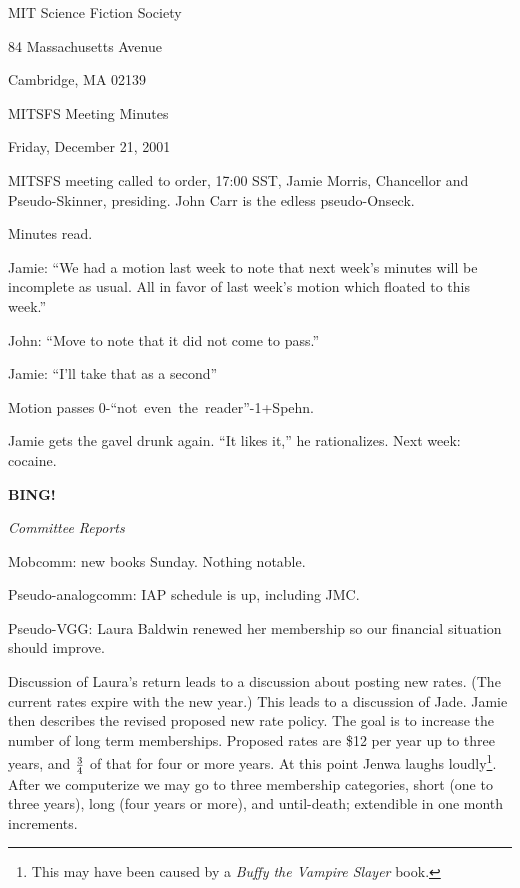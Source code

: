 \documentclass[12pt]{article}
\newcommand{\bing}{{\bf BING!} }
\newcommand{\goto}[1]{\bing \vskip 12pt \centerline{{\em{#1}}}}
\begin{document}
\begin{center}

MIT Science Fiction Society 

84 Massachusetts Avenue

Cambridge, MA 02139

\vspace{12pt}

MITSFS Meeting Minutes 

Friday, December 21, 2001

\end{center}
 
\vspace{18pt}

\setlength{\parskip}{6pt}

\noindent
MITSFS meeting called to order, 17:00 SST, Jamie Morris, Chancellor
and Pseudo-Skinner, presiding.  John Carr is the edless pseudo-Onseck.

Minutes read.

Jamie: ``We had a motion last week to note that next week's minutes will be
incomplete as usual.  All in favor of last week's motion which floated to
this week.''

John: ``Move to note that it did not come to pass.''

Jamie: ``I'll take that as a second''

Motion passes \hbox{0-``not even the reader''-1+Spehn}.

Jamie gets the gavel drunk again.  ``It likes it,'' he rationalizes.
Next week: cocaine.

\goto{Committee Reports}

Mobcomm: new books Sunday.  Nothing notable.

Pseudo-analogcomm: IAP schedule is up, including JMC.

Pseudo-VGG: Laura Baldwin renewed her membership so our financial
situation should improve.

Discussion of Laura's return leads to a discussion about posting
new rates.  (The current rates expire with the new year.)
This leads to a discussion of Jade.  Jamie then describes the
revised proposed new rate policy.  The goal is to increase the
number of long term memberships.  Proposed rates are \$12 per
year up to three years, and ${3 \over 4}$ of that for four or more
years.  At this point Jenwa laughs loudly\footnote{This may have been
caused by a {\em Buffy the Vampire Slayer} book.}.  After we computerize
we may go to three membership categories, short (one to three years),
long (four years or more), and until-death; extendible in one month
increments.
\end{document}
